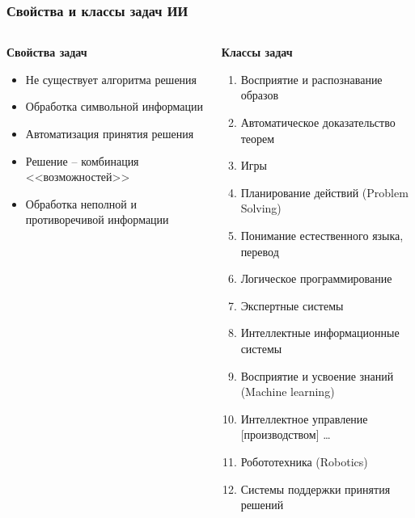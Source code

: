 \documentclass[10pt]{beamer}
\begin{document}
\begin{frame}
  \frametitle{Свойства и классы задач ИИ}
  \small
\begin{columns}
  \begin{column}{0.4\textwidth}
    \textbf{Свойства задач}
    \begin{itemize}
    \item Не существует алгоритма решения
    \item Обработка символьной информации
    \item Автоматизация принятия решения
    \item Решение -- комбинация <<возможностей>>
    \item Обработка неполной и противоречивой информации
    \end{itemize}
    \vspace{6.5em}
    \mbox{}
  \end{column}
  \begin{column}{0.6\textwidth}
    \textbf{Классы задач}
    \begin{enumerate}
    \item Восприятие и распознавание образов
    \item Автоматическое доказательство теорем
    \item Игры
    \item Планирование действий (Problem Solving)
    \item Понимание естественного языка, перевод
    \item Логическое программирование
    \item Экспертные системы
    \item Интеллектные информационные системы
    \item Восприятие и усвоение знаний (Machine learning)
    \item Интеллектное управление [производством] \ldots
    \item Робототехника (Robotics)
    \item Системы поддержки принятия решений
    \end{enumerate}
  \end{column}
\end{columns}
\end{frame}
\end{document}
